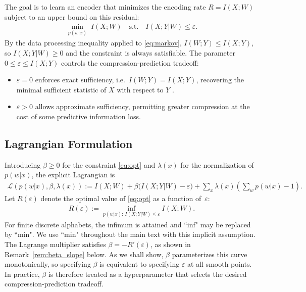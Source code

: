 \documentclass[11pt]{article}
\begin{document}
The goal is to learn an encoder that minimizes the encoding rate
$R=I(X;W)$ subject to an upper bound on this residual:
\begin{align}
    \min_{p(w|x)} \; I(X;W) \quad \text{s.t.} \quad
    I(X;Y|W) \leq \varepsilon.
    \label{eq:opt}
\end{align}
By the data processing inequality \cite{cover2006elements} applied to
\eqref{eq:markov}, $I(W;Y)\leq I(X;Y)$, so $I(X;Y|W)\geq 0$ and the
constraint is always satisfiable.
The parameter $0\leq \varepsilon\leq I(X;Y)$ controls the compression-prediction
tradeoff:
\begin{itemize}
    \item $\varepsilon=0$ enforces exact sufficiency, i.e.\
    $I(W;Y)=I(X;Y)$, recovering the minimal sufficient statistic of
    $X$ with respect to $Y$
    \cite{fisher1922mathematical,lehmann1950completeness}.
    \item $\varepsilon>0$ allows approximate sufficiency, permitting
    greater compression at the cost of some predictive information loss.
\end{itemize}

\subsection{Lagrangian Formulation}
\label{sec:lagrangian}

Introducing $\beta\geq 0$ for the constraint
\eqref{eq:opt} and $\lambda(x)$ for the normalization of $p(w|x)$,
the explicit Lagrangian is
\begin{align}
    \mathcal{L}(p(w|x),\beta,\lambda(x))
    := I(X;W) + \beta\bigl(I(X;Y|W) - \varepsilon\bigr)
    + \sum_x \lambda(x)\left(\sum_w p(w|x) - 1\right).
    \label{eq:lagrangian}
\end{align}
Let $R(\varepsilon)$ denote the optimal value of \eqref{eq:opt} as a
function of~$\varepsilon$:
\begin{align}
    R(\varepsilon) := \inf_{p(w|x):\, I(X;Y|W)\leq\varepsilon} I(X;W).
    \label{eq:rd_function}
\end{align}
For finite discrete alphabets, the infimum is attained and ``inf"
may be replaced by ``min". We use ``min" throughout the main text
with this implicit assumption.
The Lagrange multiplier satisfies $\beta=-R'(\varepsilon)$, as shown in
Remark~\ref{rem:beta_slope} below.
As we shall show, $\beta$ parameterizes this curve monotonically, so
specifying $\beta$ is equivalent to specifying $\varepsilon$ at all
smooth points.
In practice, $\beta$ is therefore treated as a hyperparameter that
selects the desired compression-prediction tradeoff.
\end{document}
